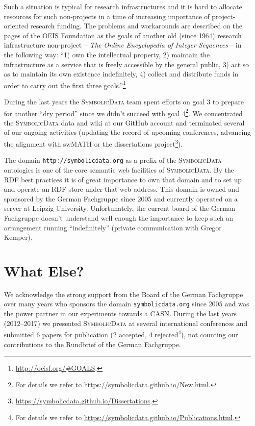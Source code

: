 \documentclass[12pt]{article}
\def\SD{\textsc{Sym\-bolic\-Data}}
\begin{document}
Such a situation is typical for research infrastructures and it is hard to
allocate resources for such non-projects in a time of increasing importance of
project-oriented research funding.  The problems and workarounds are described
on the pages of the OEIS Foundation as the goals of another old (since 1964)
research infrastructure non-project -- \emph{The Online Encyclopedia of Integer
  Sequences} -- in the following way: ``1) own the intellectual property, 2)
maintain the infrastructure as a service that is freely accessible by the
general public, 3) act so as to maintain its own existence indefinitely, 4)
collect and distribute funds in order to carry out the first three
goals.''\footnote{\url{http://oeisf.org/\#GOALS}.}

During the last years the {\SD} team spent efforts on goal 3 to prepare for
another ``dry period'' since we didn't succeed with goal 4\footnote{For details
  we refer to \url{https://symbolicdata.github.io/New.html}.}.  We concentrated
the {\SD} data and wiki at our GitHub account and terminated several of our
ongoing activities (updating the record of upcoming conferences, advancing the
alignment with swMATH or the dissertations
project\footnote{\url{https://symbolicdata.github.io/Dissertations}.}).

The domain \texttt{http://symbolicdata.org} as a prefix of the {\SD} ontologies
is one of the core semantic web facilities of {\SD}.  By the RDF best practices
it is of great importance to own that domain and to set up and operate an RDF
store under that web address.  This domain is owned and sponsored by the German
Fachgruppe since 2005 and currently operated on a server at Leipzig University.
Unfortunately, the current board of the German Fachgruppe doesn't understand
well enough the importance to keep such an arrangement running ``indefinitely''
(private communication with Gregor Kemper).

\section{What Else?}

We acknowledge the strong support from the Board of the German Fachgruppe over
many years who sponsors the domain \texttt{symbolicdata.org} since 2005 and was
the power partner in our experiments towards a CASN. During the last years
(2012--2017) we presented {\SD} at several international conferences and
submitted 6 papers for publication (2 accepted, 4 rejected\footnote{For details
  we refer to \url{https://symbolicdata.github.io/Publications.html}.}), not
counting our contributions to the Rundbrief of the German Fachgruppe.
\end{document}
